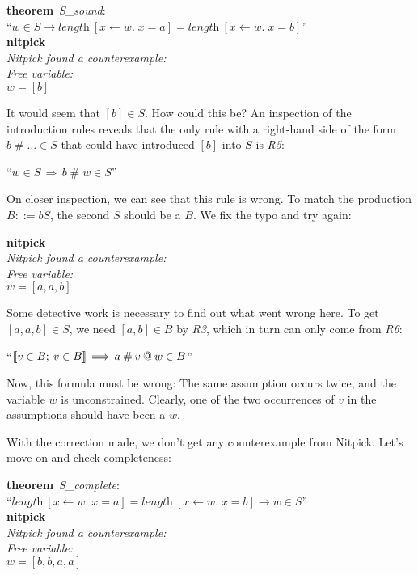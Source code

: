 \documentclass[a4paper,12pt]{article}
\begin{document}
\prew
\textbf{theorem}~\textit{S\_sound}: \\
``$w \in S \longrightarrow \textit{length}~[x\mathbin{\leftarrow} w.\; x = a] =
  \textit{length}~[x\mathbin{\leftarrow} w.\; x = b]$'' \\
\textbf{nitpick} \\[2\smallskipamount]
\slshape Nitpick found a counterexample: \\[2\smallskipamount]
\hbox{}\qquad Free variable: \nopagebreak \\
\hbox{}\qquad\qquad $w = [b]$
\postw

It would seem that $[b] \in S$. How could this be? An inspection of the
introduction rules reveals that the only rule with a right-hand side of the form
$b \mathbin{\#} {\ldots} \in S$ that could have introduced $[b]$ into $S$ is
\textit{R5}:

\prew
``$w \in S\,\Longrightarrow\, b \mathbin{\#} w \in S$''
\postw

On closer inspection, we can see that this rule is wrong. To match the
production $B ::= bS$, the second $S$ should be a $B$. We fix the typo and try
again:

\prew
\textbf{nitpick} \\[2\smallskipamount]
\slshape Nitpick found a counterexample: \\[2\smallskipamount]
\hbox{}\qquad Free variable: \nopagebreak \\
\hbox{}\qquad\qquad $w = [a, a, b]$
\postw

Some detective work is necessary to find out what went wrong here. To get $[a,
a, b] \in S$, we need $[a, b] \in B$ by \textit{R3}, which in turn can only come
from \textit{R6}:

\prew
``$\mathopen{[\![} v \in B;\> v \in B\mathclose{]\!]} \,\Longrightarrow\, a \mathbin{\#} v \mathbin{@} w \in B$''
\postw

Now, this formula must be wrong: The same assumption occurs twice, and the
variable $w$ is unconstrained. Clearly, one of the two occurrences of $v$ in
the assumptions should have been a $w$.

With the correction made, we don't get any counterexample from Nitpick. Let's
move on and check completeness:

\prew
\textbf{theorem}~\textit{S\_complete}: \\
``$\textit{length}~[x\mathbin{\leftarrow} w.\; x = a] =
   \textit{length}~[x\mathbin{\leftarrow} w.\; x = b]
  \longrightarrow w \in S$'' \\
\textbf{nitpick} \\[2\smallskipamount]
\slshape Nitpick found a counterexample: \\[2\smallskipamount]
\hbox{}\qquad Free variable: \nopagebreak \\
\hbox{}\qquad\qquad $w = [b, b, a, a]$
\postw
\end{document}
